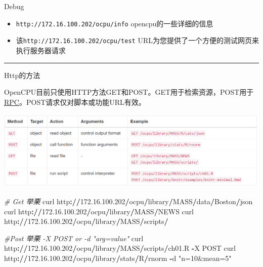\documentclass[]{book}
\newenvironment{Shaded}{\begin{snugshade}}{\end{snugshade}}
\newcommand{\FloatTok}[1]{\textcolor[rgb]{0.00,0.00,0.81}{#1}}
\newcommand{\StringTok}[1]{\textcolor[rgb]{0.31,0.60,0.02}{#1}}
\newcommand{\CommentTok}[1]{\textcolor[rgb]{0.56,0.35,0.01}{\textit{#1}}}
\newcommand{\OperatorTok}[1]{\textcolor[rgb]{0.81,0.36,0.00}{\textbf{#1}}}
\newcommand{\ErrorTok}[1]{\textcolor[rgb]{0.64,0.00,0.00}{\textbf{#1}}}
\newcommand{\NormalTok}[1]{#1}
\providecommand{\tightlist}{%
  \setlength{\itemsep}{0pt}\setlength{\parskip}{0pt}}
\begin{document}
Debug

\begin{itemize}
\tightlist
\item
  \texttt{http://172.16.100.202/ocpu/info} opencpu的一些详细的信息
\item
  该\texttt{http://172.16.100.202/ocpu/test}
  URL为您提供了一个方便的测试网页来执行服务器请求
\end{itemize}

\begin{center}\rule{0.5\linewidth}{\linethickness}\end{center}

Http的方法

OpenCPU目前只使用HTTP方法GET和POST。GET用于检索资源，POST用于\href{https://blog.csdn.net/b1303110335/article/details/79557292}{RPC}。POST请求仅对脚本或功能URL有效。

\includegraphics{pic/opencpu/p1.png}

\begin{Shaded}
\begin{Highlighting}[]
\CommentTok{# Get 举栗}
\NormalTok{curl http}\OperatorTok{:}\ErrorTok{//}\FloatTok{172.16}\NormalTok{.}\FloatTok{100.202}\OperatorTok{/}\NormalTok{ocpu}\OperatorTok{/}\NormalTok{library}\OperatorTok{/}\NormalTok{MASS}\OperatorTok{/}\NormalTok{data}\OperatorTok{/}\NormalTok{Boston}\OperatorTok{/}\NormalTok{json}
\NormalTok{curl http}\OperatorTok{:}\ErrorTok{//}\FloatTok{172.16}\NormalTok{.}\FloatTok{100.202}\OperatorTok{/}\NormalTok{ocpu}\OperatorTok{/}\NormalTok{library}\OperatorTok{/}\NormalTok{MASS}\OperatorTok{/}\NormalTok{NEWS}
\NormalTok{curl http}\OperatorTok{:}\ErrorTok{//}\FloatTok{172.16}\NormalTok{.}\FloatTok{100.202}\OperatorTok{/}\NormalTok{ocpu}\OperatorTok{/}\NormalTok{library}\OperatorTok{/}\NormalTok{MASS}\OperatorTok{/}\NormalTok{scripts}\OperatorTok{/}

\CommentTok{#Post 举栗 -X POST or -d "arg=value"}
\NormalTok{curl http}\OperatorTok{:}\ErrorTok{//}\FloatTok{172.16}\NormalTok{.}\FloatTok{100.202}\OperatorTok{/}\NormalTok{ocpu}\OperatorTok{/}\NormalTok{library}\OperatorTok{/}\NormalTok{MASS}\OperatorTok{/}\NormalTok{scripts}\OperatorTok{/}\NormalTok{ch01.R }\OperatorTok{-}\NormalTok{X POST}
\NormalTok{curl http}\OperatorTok{:}\ErrorTok{//}\FloatTok{172.16}\NormalTok{.}\FloatTok{100.202}\OperatorTok{/}\NormalTok{ocpu}\OperatorTok{/}\NormalTok{library}\OperatorTok{/}\NormalTok{stats}\OperatorTok{/}\NormalTok{R}\OperatorTok{/}\NormalTok{rnorm }\OperatorTok{-}\NormalTok{d }\StringTok{"n=10&mean=5"}

\end{Highlighting}
\end{Shaded}
\end{document}
